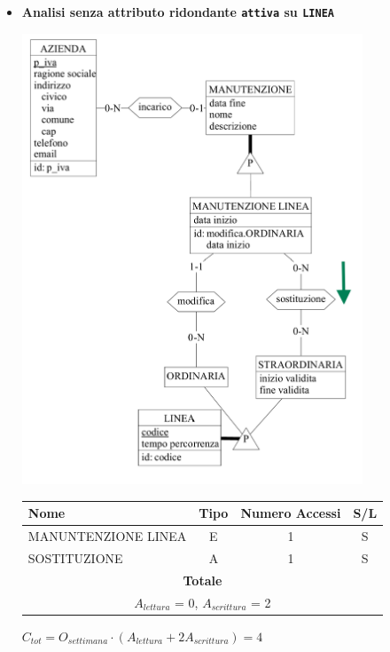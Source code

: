 \documentclass[12pt,a4paper]{report}
\begin{document}
\begin{enumerate}[label=\textbf{\arabic*}]
\begin{itemize}
            \item \textbf{Analisi senza attributo ridondante \texttt{attiva} su \texttt{LINEA}} \\
	\begin{center}
	\includegraphics[width=0.8\textwidth]{InserimentoVariazioneServizioNoRid}
	\end{center}
	\begin{table}[H]
	\centering
	\begin{tabular}{|l|c|c|c|}
	\hline
	Nome & Tipo & Numero Accessi & S/L \\
	\hline
	MANUNTENZIONE LINEA & E & 1 & S \\
	\hline
	SOSTITUZIONE & A & 1 & S \\
	\hline
	    \multicolumn{4}{c}{\textbf{Totale}} \\
	    \multicolumn{4}{c}{${A_{lettura}}$ = 0, ${A_{scrittura}}$ = 2} \\
	    \hline
	    \end{tabular}
	    \end{table}
	    \begin{center}
	    ${C_{tot} = {O_{settimana}}\cdot({A_{lettura}} + {2A_{scrittura}})= 4}$
	    \end{center}

	\end{itemize}



\end{enumerate}
\end{document}
